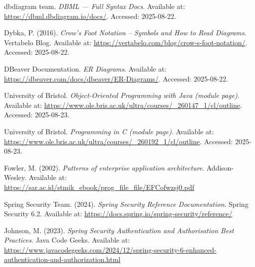 \begin{thebibliography}{99}
dbdiagram team. \emph{DBML — Full Syntax Docs}. Available at:
\url{https://dbml.dbdiagram.io/docs/}. Accessed: 2025-08-22.

Dybka, P. (2016). \emph{Crow’s Foot Notation – Symbols and How to Read Diagrams}.
Vertabelo Blog. Available at:
\url{https://vertabelo.com/blog/crow-s-foot-notation/}. Accessed: 2025-08-22.

DBeaver Documentation. \emph{ER Diagrams}. Available at:
\url{https://dbeaver.com/docs/dbeaver/ER-Diagrams/}. Accessed: 2025-08-22.

University of Bristol.
\emph{Object-Oriented Programming with Java (module page)}.
Available at: \url{https://www.ole.bris.ac.uk/ultra/courses/_260147_1/cl/outline}.
Accessed: 2025-08-23.

University of Bristol.
\emph{Programming in C (module page)}.
Available at: \url{https://www.ole.bris.ac.uk/ultra/courses/_260192_1/cl/outline}.
Accessed: 2025-08-23.

    Fowler, M. (2002). \emph{Patterns of enterprise application architecture}. Addison-Wesley.
    Available at: \url{https://sar.ac.id/stmik_ebook/prog_file_file/EFCofwzsj0.pdf}

    Spring Security Team. (2024). \emph{Spring Security Reference Documentation}. Spring Security 6.2.
    Available at: \url{https://docs.spring.io/spring-security/reference/}

    Johnson, M. (2023). \emph{Spring Security Authentication and Authorisation Best Practices}. Java Code Geeks.
    Available at: \url{https://www.javacodegeeks.com/2024/12/spring-security-6-enhanced-authentication-and-authorization.html}

\end{thebibliography}
